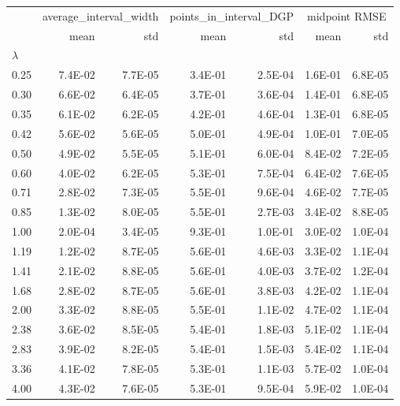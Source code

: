 \begin{tabular}{lrrrrrr}
 & \multicolumn{2}{c}{average_interval_width} & \multicolumn{2}{c}{points_in_interval_DGP} & \multicolumn{2}{c}{midpoint RMSE} \\
 & mean & std & mean & std & mean & std \\
$\lambda$ &  &  &  &  &  &  \\
0.25 & 7.4E-02 & 7.7E-05 & 3.4E-01 & 2.5E-04 & 1.6E-01 & 6.8E-05 \\
0.30 & 6.6E-02 & 6.4E-05 & 3.7E-01 & 3.6E-04 & 1.4E-01 & 6.8E-05 \\
0.35 & 6.1E-02 & 6.2E-05 & 4.2E-01 & 4.6E-04 & 1.3E-01 & 6.8E-05 \\
0.42 & 5.6E-02 & 5.6E-05 & 5.0E-01 & 4.9E-04 & 1.0E-01 & 7.0E-05 \\
0.50 & 4.9E-02 & 5.5E-05 & 5.1E-01 & 6.0E-04 & 8.4E-02 & 7.2E-05 \\
0.60 & 4.0E-02 & 6.2E-05 & 5.3E-01 & 7.5E-04 & 6.4E-02 & 7.6E-05 \\
0.71 & 2.8E-02 & 7.3E-05 & 5.5E-01 & 9.6E-04 & 4.6E-02 & 7.7E-05 \\
0.85 & 1.3E-02 & 8.0E-05 & 5.5E-01 & 2.7E-03 & 3.4E-02 & 8.8E-05 \\
1.00 & 2.0E-04 & 3.4E-05 & 9.3E-01 & 1.0E-01 & 3.0E-02 & 1.0E-04 \\
1.19 & 1.2E-02 & 8.7E-05 & 5.6E-01 & 4.6E-03 & 3.3E-02 & 1.1E-04 \\
1.41 & 2.1E-02 & 8.8E-05 & 5.6E-01 & 4.0E-03 & 3.7E-02 & 1.2E-04 \\
1.68 & 2.8E-02 & 8.7E-05 & 5.6E-01 & 3.8E-03 & 4.2E-02 & 1.1E-04 \\
2.00 & 3.3E-02 & 8.8E-05 & 5.5E-01 & 1.1E-02 & 4.7E-02 & 1.1E-04 \\
2.38 & 3.6E-02 & 8.5E-05 & 5.4E-01 & 1.8E-03 & 5.1E-02 & 1.1E-04 \\
2.83 & 3.9E-02 & 8.2E-05 & 5.4E-01 & 1.5E-03 & 5.4E-02 & 1.1E-04 \\
3.36 & 4.1E-02 & 7.8E-05 & 5.3E-01 & 1.1E-03 & 5.7E-02 & 1.0E-04 \\
4.00 & 4.3E-02 & 7.6E-05 & 5.3E-01 & 9.5E-04 & 5.9E-02 & 1.0E-04 \\
\end{tabular}

